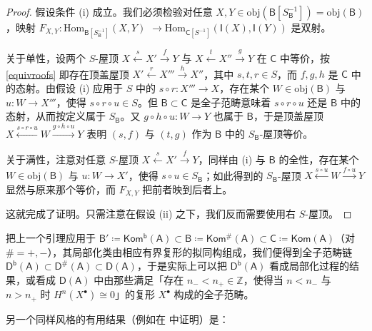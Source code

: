\begin{proof}
	假设条件 (i) 成立。我们必须检验对任意 $X,Y\in\text{obj}(\mathsf{B}[S_\mathsf{B}^{-1}])=\text{obj}(\mathsf{B})$，映射 $F_{X,Y}:\text{Hom}_{\mathsf{B}[S_\mathsf{B}^{-1}]}(X,Y)$ $\rightarrow \text{Hom}_{\mathsf{C}[S^{-1}]}(\mathsf{I}(X),\mathsf{I}(Y))$ 是双射。 
	
	关于单性，设两个 $S$-屋顶 $X\xleftarrow{s} X'\xrightarrow{f} Y$ 与 $X\xleftarrow{t} X''\xrightarrow{g} Y$ 在 $\mathsf{C}$ 中等价，按 \eqref{equivroofs} 即存在顶盖屋顶 $X'\xleftarrow{r} X'''\xrightarrow{h} X''$，其中 $s, t, r\in S$，而 $f, g, h$ 是 $\mathsf{C}$ 中的态射。由假设 (i) 应用于 $S$ 中的 $s\circ r: X'''\rightarrow X$，存在某个 $W\in\text{obj}(\mathsf{B})$ 与 $u:W\rightarrow X'''$，使得 $s\circ r\circ u\in S$。但 $\mathsf{B}\subset\mathsf{C}$ 是全子范畴意味着 $s\circ r\circ u$ 还是 $\mathsf{B}$ 中的态射，从而按定义属于 $S_\mathsf{B}$。又 $g\circ h\circ u:W\rightarrow Y$ 也属于 $\mathsf{B}$，于是顶盖屋顶 $X\xleftarrow{s\circ r\circ u} W\xrightarrow{g\circ h\circ u} Y$ 表明 $(s,f)$ 与 $(t,g)$ 作为 $\mathsf{B}$ 中的 $S_\mathsf{B}$-屋顶等价。
	
	关于满性，注意对任意 $S$-屋顶 $X\xleftarrow{s} X'\xrightarrow{f} Y$，同样由 (i) 与 $\mathsf{B}$ 的全性，存在某个 $W\in\text{obj}(\mathsf{B})$ 与 $u:W\rightarrow X'$，使得 $s\circ u\in S_\mathsf{B}$；如此得到的 $S_\mathsf{B}$-屋顶 $X\xleftarrow{s\circ u} W\xrightarrow{f\circ u} Y$ 显然与原来那个等价，而 $F_{X,Y}$ 把前者映到后者上。
	
	这就完成了证明。只需注意在假设 (ii) 之下，我们反而需要使用右 $S$-屋顶。
\end{proof}

把上一个引理应用于 $\mathsf{B}'\!\coloneqq\!\mathsf{Kom^b(A)}\subset\mathsf{B}\!\coloneqq\!\mathsf{Kom^\#\!(A)}\subset\mathsf{C}\!\coloneqq\!\mathsf{Kom(A)}$（对\break $\#=+,-$），其局部化类由相应有界复形的拟同构组成，我们便得到全子范畴链 $\mathsf{D^b(A)}\subset\mathsf{D^\#\!(A)}\subset\mathsf{D(A)}$，于是实际上可以把 $\mathsf{D^b(A)}$ 看成局部化过程的结果，或看成 $\mathsf{D(A)}$ 中由那些满足「存在 $n_-<n_+\in\mathbb{Z}$，使得当 $n<n_-$ 与 $n>n_+$ 时 $H^n(X^\bullet)\cong 0$」的复形 $X^\bullet$ 构成的全子范畴。

另一个同样风格的有用结果（例如在 \cite[Theorem 13.2.8]{[KS06]} 中证明）是：

